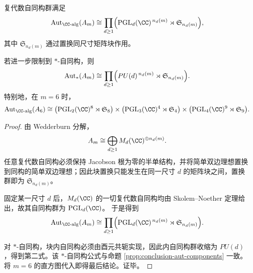 \begin{theorem}[纤维群胚代数的复代数自同构群]\label{thm:conclusion-foldbin-groupoid-aut-pgl-pu}
复代数自同构群满足
\[
\mathrm{Aut}_{\CC\text{-alg}}(A_m)
\cong
\prod_{d\ge 1}
\Bigl(\operatorname{PGL}_d(\CC)^{\,n_d(m)}\rtimes \mathfrak S_{n_d(m)}\Bigr),
\]
其中 \(\mathfrak S_{n_d(m)}\) 通过置换同尺寸矩阵块作用。

若进一步限制到 \(\ast\)-自同构，则
\[
\mathrm{Aut}_{\ast}(A_m)
\cong
\prod_{d\ge 1}
\Bigl(PU(d)^{\,n_d(m)}\rtimes \mathfrak S_{n_d(m)}\Bigr).
\]
特别地，在 \(m=6\) 时，
\[
\mathrm{Aut}_{\CC\text{-alg}}(A_6)
\cong
\bigl(\operatorname{PGL}_2(\CC)^8\rtimes \mathfrak S_8\bigr)
\times
\bigl(\operatorname{PGL}_3(\CC)^4\rtimes \mathfrak S_4\bigr)
\times
\bigl(\operatorname{PGL}_4(\CC)^9\rtimes \mathfrak S_9\bigr).
\]
\end{theorem}
\begin{proof}
由 Wedderburn 分解，
\[
A_m\cong \bigoplus_{d\ge 1}M_d(\CC)^{\oplus n_d(m)}.
\]
任意复代数自同构必须保持 Jacobson 根为零的半单结构，并将简单双边理想置换到同构的简单双边理想；因此块置换只能发生在同一尺寸 \(d\) 的矩阵块之间，置换群即为 \(\mathfrak S_{n_d(m)}\)。

固定某一尺寸 \(d\) 后，\(M_d(\CC)\) 的一切复代数自同构均由 Skolem--Noether 定理给出，故其自同构群为 \(\operatorname{PGL}_d(\CC)\)。
于是得到
\[
\mathrm{Aut}_{\CC\text{-alg}}(A_m)
\cong
\prod_{d\ge 1}
\Bigl(\operatorname{PGL}_d(\CC)^{\,n_d(m)}\rtimes \mathfrak S_{n_d(m)}\Bigr).
\]

对 \(\ast\)-自同构，块内自同构必须由酉元共轭实现，因此内自同构群收缩为 \(PU(d)\)，得到第二式。该 \(\ast\)-自同构公式与命题 \ref{prop:conclusion-aut-components} 一致。将 \(m=6\) 的直方图代入即得最后结论。证毕。
\end{proof}


